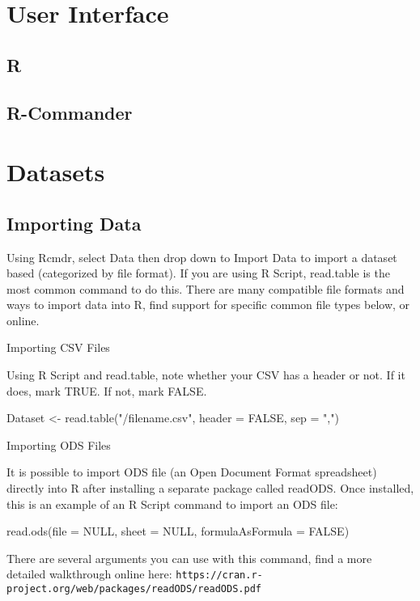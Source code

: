 %
%
%
%
%

\section{User Interface}

\subsection{R}

\subsection{R-Commander}

\section{Datasets}

\subsection{Importing Data}
Using Rcmdr, select Data then drop down to Import Data to import a dataset based (categorized by file format). If you are using R Script, read.table is the most common command to do this. There are many compatible file formats and ways to import data into R, find support for specific common file types below, or online.

Importing CSV Files

Using R Script and read.table, note whether your CSV has a header or not. If it does, mark TRUE. If not, mark FALSE.

Dataset <-  read.table("/filename.csv", header = FALSE, sep = ",")

Importing ODS Files

It is possible to import ODS file (an Open Document Format spreadsheet) directly into R after installing a separate package called readODS. Once installed, this is an example of an R Script command to import an ODS file:

read.ods(file = NULL, sheet = NULL, formulaAsFormula = FALSE)

There are several arguments you can use with this command, find a more detailed walkthrough online here: \texttt{https://cran.r-project.org/web/packages/readODS/readODS.pdf}

